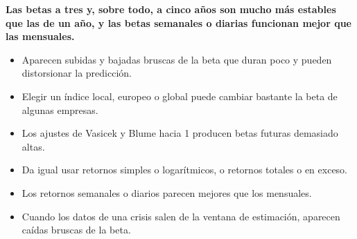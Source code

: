 \documentclass{article}
\newcommand{\bodysize}{\fontsize{27}{35.6}\selectfont}
\newcommand{\cardtitlesize}{\fontsize{31.9}{38.3}\selectfont}
\newcommand{\smallsize}{\fontsize{22.1}{28.7}\selectfont}
\newcommand{\cardtitle}[2][navy]{{\color{#1}\cardtitlesize\bfseries\textls[110]{\MakeUppercase{#2}}}\par\vspace{7mm}}
\begin{document}
\vfill
\hspace*{34mm}\begin{minipage}{773mm}
\begin{tcolorbox}[card=teal]\cardtitle[teal]{Resultados}
\begin{tcolorbox}[enhanced, sharp corners, colback=tealSoft, boxrule=0pt, left=14mm, right=14mm, top=10mm, bottom=11mm,
  borderline west={4mm}{0mm}{teal}, fontupper=\bodysize\color{ink}\raggedright]
{\color{teal}\smallsize\bfseries{}}\par\vspace{4mm}
{\bfseries Las betas a tres y, sobre todo, a cinco años son mucho más estables que las de un año, y las betas semanales o diarias funcionan mejor que las mensuales.}
\end{tcolorbox}
\vspace{11mm}
\begin{minipage}[t]{0.48\linewidth}
\begin{itemize}
\item Aparecen subidas y bajadas bruscas de la beta que duran poco y pueden distorsionar la predicción.
\item Elegir un índice local, europeo o global puede cambiar bastante la beta de algunas empresas.
\item Los ajustes de Vasicek y Blume hacia 1 producen betas futuras demasiado altas.
\end{itemize}
\end{minipage}\hfill
\begin{minipage}[t]{0.48\linewidth}
\begin{itemize}
\item Da igual usar retornos simples o logarítmicos, o retornos totales o en exceso.
\item Los retornos semanales o diarios parecen mejores que los mensuales.
\item Cuando los datos de una crisis salen de la ventana de estimación, aparecen caídas bruscas de la beta.
\end{itemize}
\end{minipage}
\end{tcolorbox}
\end{minipage}
\end{document}

